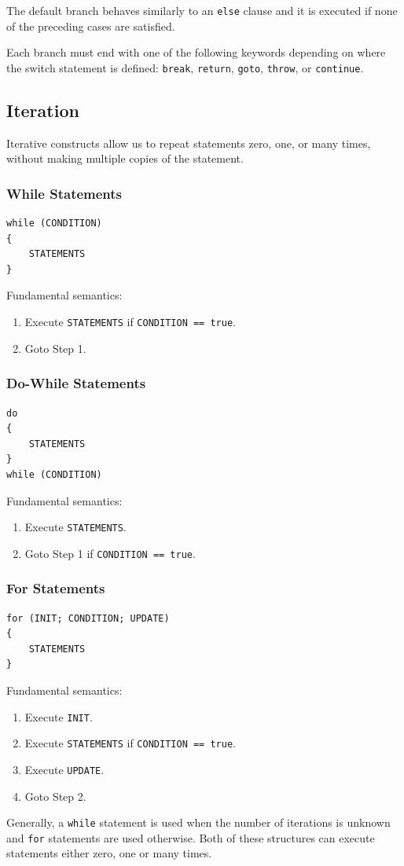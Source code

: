 \documentclass{article}
\begin{document}
The default branch behaves similarly to an \lstinline{else} clause and it is executed if
none of the preceding cases are satisfied.

Each branch must end with one of the following keywords depending on where the
switch statement is defined: \lstinline{break}, \lstinline{return},
\lstinline{goto}, \lstinline{throw}, or \lstinline{continue}.
\subsection{Iteration}
Iterative constructs allow us to repeat statements zero, one, or many times,
without making multiple copies of the statement.
\subsubsection{While Statements}
\begin{lstlisting}[numbers=none]
while (CONDITION) 
{
    STATEMENTS
}
\end{lstlisting}
Fundamental semantics:
\begin{enumerate}
    \item Execute \lstinline{STATEMENTS} if \lstinline{CONDITION == true}. %
    \item Goto Step 1.
\end{enumerate}
\subsubsection{Do-While Statements}
\begin{lstlisting}[numbers=none]
do 
{
    STATEMENTS
}
while (CONDITION) 
\end{lstlisting}
Fundamental semantics:
\begin{enumerate}
    \item Execute \lstinline{STATEMENTS}. %
    \item Goto Step 1 if \lstinline{CONDITION == true}.
\end{enumerate}
\subsubsection{For Statements}
\begin{lstlisting}[numbers=none]
for (INIT; CONDITION; UPDATE) 
{
    STATEMENTS
}
\end{lstlisting}
Fundamental semantics:
\begin{enumerate}
    \item Execute \lstinline{INIT}. %
    \item Execute \lstinline{STATEMENTS} if \lstinline{CONDITION == true}. %
    \item Execute \lstinline{UPDATE}.
    \item Goto Step 2.
\end{enumerate}
Generally, a \lstinline{while} statement is used when the number of iterations is unknown and
\lstinline{for} statements are used otherwise. Both of these structures can execute
statements either zero, one or many times.
\end{document}
